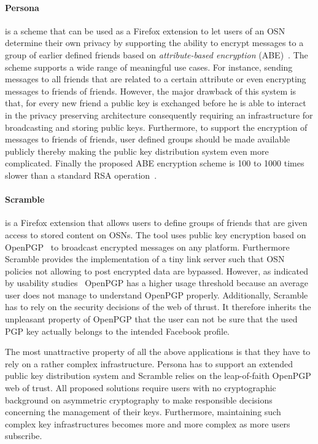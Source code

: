 \paragraph{Persona~\cite{art:BadenBSBS09}} is a scheme that can be used as a Firefox extension to let users of an OSN determine their own privacy by supporting the ability to encrypt messages to a group of earlier defined friends based on \textit{attribute-based encryption} (ABE)~\cite{art:SahaiW04}. The scheme supports a wide range of meaningful use cases. For instance, sending messages to all friends that are related to a certain attribute or even encrypting messages to friends of friends. However, the major drawback of this system is that, for every new friend  a public key is exchanged before he is able to interact in the privacy preserving architecture consequently requiring an infrastructure for broadcasting and storing public keys. Furthermore, to support the encryption of messages to friends of friends, user defined groups should be made available publicly thereby making the public key distribution system even more complicated. Finally the proposed ABE encryption scheme is 100 to 1000 times slower than a standard RSA operation~\cite{art:BadenBSBS09}.

\paragraph{Scramble~\cite{art:BeatoKW11}} is a Firefox extension that allows users to define groups of friends that are given access to stored content on OSNs. The tool uses public key encryption based on OpenPGP~\cite{rfc4880} to broadcast encrypted messages on any platform. Furthermore Scramble provides the implementation of a tiny link server such that OSN policies not allowing to post encrypted data are bypassed. However, as indicated by usability studies~\cite{art:WhittenT99} OpenPGP has a higher usage threshold because an average user does not manage to understand OpenPGP properly. Additionally, Scramble has to rely on the security decisions of the web of thrust. It therefore inherits the unpleasant property of OpenPGP that the user can not be sure that the used PGP key actually belongs to the intended Facebook profile.

The most unattractive property of all the above applications is that they have to rely on a rather complex infrastructure. Persona has to support an extended public key distribution system and Scramble relies on the leap-of-faith OpenPGP web of trust. All proposed solutions require users with no cryptographic background on asymmetric cryptography to make responsible decisions concerning the management of their keys. Furthermore, maintaining such complex key infrastructures becomes more and more complex as more users subscribe.

